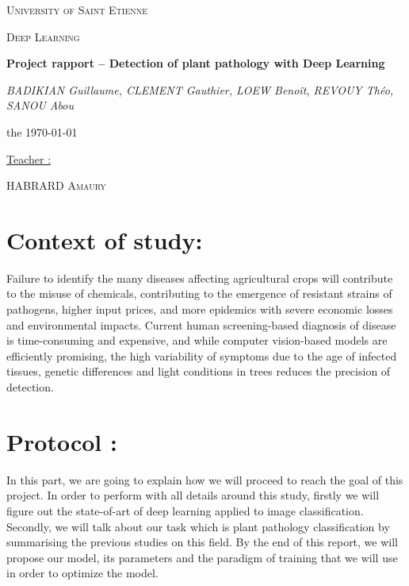 \documentclass[a4paper]{article}
\begin{document}
\begin{titlepage}

\centering

\hrulefill\par
\vspace{1cm}
{\scshape\LARGE University of Saint Etienne\par}
\vspace{1cm}
{\scshape\Large Deep Learning \par}
\vspace{1cm}
{\huge\bfseries Project rapport -- Detection of plant pathology with Deep Learning \par}
\vspace{1cm}
{\Large\itshape BADIKIAN Guillaume, CLEMENT Gauthier, LOEW Benoît, REVOUY Théo, SANOU Abou\par}
\vspace{0.8cm}
{\large the \today\par}
\vfill
\underline{Teacher :} \par
HABRARD \textsc{Amaury} \par
\hrulefill\par

\end{titlepage}
\tableofcontents




\newpage

\section{Context of study: }

Failure to identify the many diseases affecting agricultural crops will contribute to the misuse of chemicals, contributing to the emergence of resistant strains of pathogens, higher input prices, and more epidemics with severe economic losses and environmental impacts. Current human screening-based diagnosis of disease is time-consuming and expensive, and while computer vision-based models are efficiently promising, the high variability of symptoms due to the age of infected tissues, genetic differences and light conditions in trees reduces the precision of detection.

\section{Protocol : }
In this part, we are going to explain how we will proceed to reach the goal of this project.
In order to perform with all details around this study, firstly we will figure out the state-of-art of deep learning applied to image classification.
Secondly, we will talk about our task which is plant pathology classification by summarising the previous studies on this field.
By the end of this report, we will propose our model, its parameters and the paradigm of training that we will use in order to optimize the model.  
\end{document}
